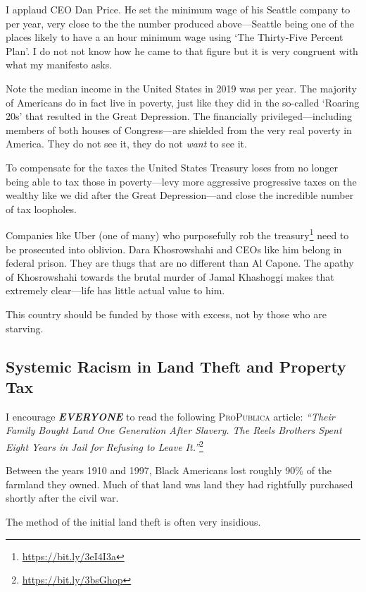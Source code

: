I applaud CEO Dan Price. He set the minimum wage of his Seattle company to  per year, very close to the the number produced above---Seattle being one of the places likely to have a  an hour minimum wage using `The Thirty-Five Percent Plan'. I do not not know how he came to that figure but it is very congruent with what my manifesto asks.

Note the median income in the United States in 2019 was  per year. The majority of Americans do in fact live in poverty, just like they did in the so-called `Roaring 20s' that resulted in the Great Depression. The financially privileged---including members of both houses of Congress---are shielded from the very real poverty in America. They do not see it, they do not \emph{want} to see it.

To compensate for the taxes the United States Treasury loses from no longer being able to tax those in poverty---levy more aggressive progressive taxes on the wealthy like we did after the Great Depression---and close the incredible number of tax loopholes.

Companies like Uber (one of many) who purposefully rob the treasury\footnote{\url{https://bit.ly/3eI4I3a}} need to be prosecuted into oblivion. Dara Khosrowshahi and CEOs like him belong in federal prison. They are thugs that are no different than Al Capone. The apathy of Khosrowshahi towards the brutal murder of Jamal Khashoggi makes that extremely clear---life has little actual value to him.

This country should be funded by those with excess, not by those who are starving.

\subsection{Systemic Racism in Land Theft and Property Tax}

I encourage \textbf{\emph{EVERYONE}} to read the following \textsc{ProPublica} article: \textit{``Their Family Bought Land One Generation After Slavery. The Reels Brothers Spent Eight Years in Jail for Refusing to Leave It.''}\footnote{\url{https://bit.ly/3bsGhop}}

\bigskip

Between the years 1910 and 1997, Black Americans lost roughly 90\% of the farmland they owned. Much of that land was land they had rightfully purchased shortly after the civil war.

The method of the initial land theft is often very insidious.


